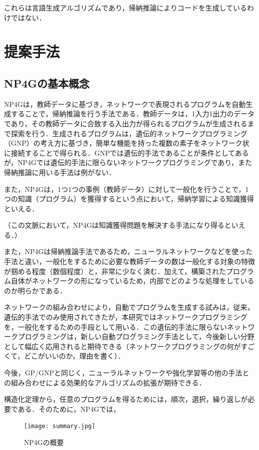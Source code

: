 \documentclass[exploratorypaper]{jsaiart} %
\begin{document}
これらは言語生成アルゴリズムであり，帰納推論によりコードを生成しているわけではない．

\section{提案手法}
\subsection{NP4Gの基本概念}
NP4Gは，教師データに基づき，ネットワークで表現されるプログラムを自動生成することで，帰納推論を行う手法である．教師データは，1入力1出力のデータであり，その教師データに合致する入出力が得られるプログラムが生成されるまで探索を行う．生成されるプログラムは，遺伝的ネットワークプログラミング（GNP）の考え方に基づき，簡単な機能を持った複数の素子をネットワーク状に接続することで得られる．GNPでは遺伝的手法であることが条件としてあるが，NP4Gでは遺伝的手法に限らないネットワークプログラミングであり，また帰納推論に用いる手法は例がない．

また，NP4Gは，1つ1つの事例（教師データ）に対して一般化を行うことで，1つの知識（プログラム）を獲得するという点において，帰納学習による知識獲得といえる．

（この文脈において，NP4Gは知識獲得問題を解決する手法になり得るといえる．）

また，NP4Gは帰納推論手法であるため，ニューラルネットワークなどを使った手法と違い，一般化をするために必要な教師データの数は一般化する対象の特徴が掴める程度（数個程度）と，非常に少なく済む．加えて，構築されたプログラム自体がネットワークの形になっているため，内部でどのような処理をしているのか明らかである．

ネットワークの組み合わせにより，自動でプログラムを生成する試みは，従来，遺伝的手法でのみ使用されてきたが，本研究ではネットワークプログラミングを，一般化をするための手段として用いる．この遺伝的手法に限らないネットワークプログラミングは，新しい自動プログラミング手法として，今後新しい分野として幅広く応用されると期待できる（ネットワークプログラミングの何がすごくて，どこがいいのか，理由を書く）．

今後，GP/GNPと同じく，ニューラルネットワークや強化学習等の他の手法との組み合わせによる効果的なアルゴリズムの拡張が期待できる．

構造化定理から，任意のプログラムを得るためには，順次，選択，繰り返しが必要である．そのために，NP4Gでは，
\begin{figure}[t]
    \begin{center}
        \texttt{[image: summary.jpg]}
    \end{center}
    \capwidth=90mm %
    \caption{NP4Gの概要}
    \label{fig:summary}
\end{figure}
\end{document}
